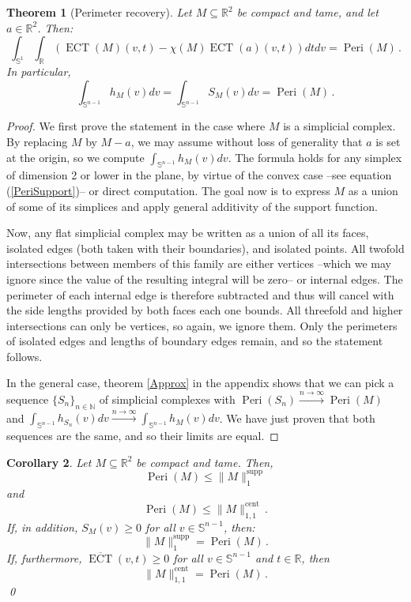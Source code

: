 \documentclass[a4paper]{article}
\newtheorem{theorem}{Theorem}[section]
\newtheorem{coro}[theorem]{Corollary}
\newcommand{\ECT}{\operatorname{ECT}}
\newcommand{\bb}{\mathbb}
\newcommand{\Peri}{\operatorname{Peri}}
\newcommand{\normsupp}[1]{\|#1\|^{\operatorname{supp}}}
\newcommand{\normcent}[1]{\|#1\|^{\operatorname{cent}}}
\begin{document}
\begin{theorem}[Perimeter recovery]
	\label{PeriRecovery}
	Let $M \subseteq \bb R^2$ be compact and tame, and let $a \in \bb R^2$. Then:
	\[ \int_{\bb S^1} \int_{\bb R} (\ECT(M)(v,t)- \chi(M) \ECT(a)(v,t)) dt dv=\Peri(M)\, .\]
	In particular, \[ \int_{\bb S^{n-1}} h_M(v) dv=\int_{\bb S^{n-1}} S_M(v) dv=\Peri(M)\, . \]
\end{theorem}

\begin{proof}
	We first prove the statement in the case where $M$ is a simplicial complex. By replacing $M$ by $M-a$, we may assume without loss of generality that $a$ is set at the origin, so we compute $\int_{\bb S^{n-1}} h_M(v) dv$.
	The formula holds for any simplex of dimension 2 or lower in the plane, by virtue of the convex case --see equation (\ref{PeriSupport})-- or direct computation. The goal now is to express $M$ as a union of some of its simplices and apply general additivity of the support function.
	
	Now, any flat simplicial complex may be written as a union of all its faces, isolated edges (both taken with their boundaries), and isolated points. All twofold intersections between members of this family are either vertices --which we may ignore since the value of the resulting integral will be zero-- or internal edges. The perimeter of each internal edge is therefore subtracted and thus will cancel with the side lengths provided by both faces each one bounds. All threefold and higher intersections can only be vertices, so again, we ignore them. Only the perimeters of isolated edges and lengths of boundary edges remain, and so the statement follows. 
	
	In the general case, theorem \ref{Approx} in the appendix shows that we can pick a sequence $\{S_n\}_{n \in \bb N}$ of simplicial complexes with $\Peri(S_n) \overset{n \to \infty}\rightarrow \Peri(M)$ and $\int_{\bb S^{n-1}} h_{S_n}(v) dv \overset{n \to \infty}\rightarrow \int_{\bb S^{n-1}} h_M(v) dv $. We have just proven that both sequences are the same, and so their limits are equal.
\end{proof}

\begin{coro}
	\label{NormGeoIneqs}
	Let $M\subseteq \bb R^2$ be compact and tame. Then,
	\[ \Peri(M) \leq \normsupp M_1 \]
	and
	\[ \Peri(M) \leq \normcent M_{1,1}\, . \]
	 If, in addition, $S_M(v) \geq 0$ for all $v \in \bb S^{n-1}$, then:
	\[\normsupp M_1=\Peri(M)\, .\] 
	If, furthermore, $\overline{\ECT}(v,t) \geq 0$ for all  $v \in \bb S^{n-1}$ and $t \in \bb R$, then
	\[ \normcent M_{1,1}=\Peri(M)\, . \]
	\qed
\end{coro}
\end{document}

